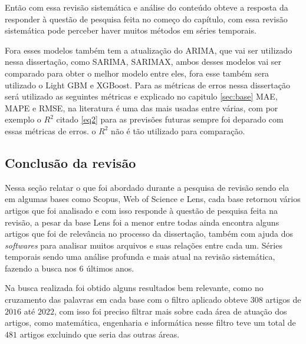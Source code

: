 Então com essa revisão sistemática e análise do conteúdo obteve a resposta da responder à questão de pesquisa feita no começo do capítulo, com essa revisão sistemática pode perceber haver muitos métodos em séries temporais.

Fora esses modelos também tem a atualização do ARIMA, que vai ser utilizado nessa dissertação, como SARIMA, SARIMAX, ambos desses modelos vai ser comparado para obter o melhor modelo entre eles, fora esse também sera utilizado o Light GBM e XGBoost. Para as métricas de erros nessa dissertação será utilizado as seguintes métricas e explicado no capitulo \ref{sec:base} MAE, MAPE e RMSE, na literatura é uma das mais usadas entre várias, com por exemplo o $R^2$ citado \eqref{eq2} para as previsões futuras sempre foi deparado com essas métricas de erros. o $R^2$ não é tão utilizado para comparação.

\subsection{Conclusão da revisão} \label{subsec:conclusão da revisão}

Nessa seção relatar o que foi abordado durante a pesquisa de revisão sendo ela em algumas bases como Scopus, Web of Science e Lens, cada base retornou vários artigos que foi analisado e com isso responde à questão de pesquisa feita na revisão, a pesar da base Lens foi a menor entre todas ainda encontra alguns artigos que foi de relevância no processo da dissertação, também com ajuda dos \textit{softwares} para analisar muitos arquivos e suas relações entre cada um. Séries temporais sendo uma análise profunda e mais atual na revisão sistemática, fazendo a busca nos 6 últimos anos.

Na busca realizada foi obtido alguns resultados bem relevante, como no cruzamento das palavras em cada base com o filtro aplicado obteve $ 308 $ artigos de $ 2016 $ até $ 2022 $, com isso foi preciso filtrar mais sobre cada área de atuação dos artigos, como matemática, engenharia e informática nesse filtro teve um total de $ 481 $ artigos excluindo que seria das outras áreas.




